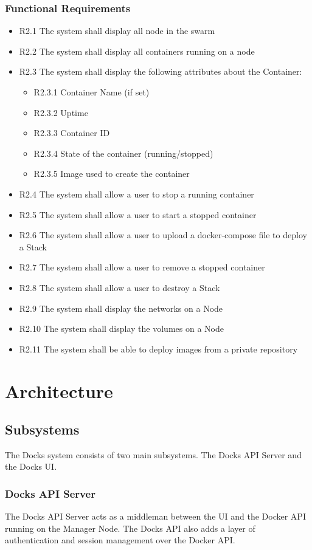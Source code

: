 \documentclass[]{article}
\begin{document}
\subsubsection{Functional Requirements}
\begin{itemize}
	\item R2.1 The system shall display all node in the swarm
	\item R2.2 The system shall display all containers running on a node
	\item R2.3 The system shall display the following attributes about the Container:
		\begin{itemize}
			\item R2.3.1 Container Name (if set)
			\item R2.3.2 Uptime
			\item R2.3.3 Container ID
			\item R2.3.4 State of the container (running/stopped)
			\item R2.3.5 Image used to create the container
		\end{itemize}
	\item R2.4 The system shall allow a user to stop a running container
	\item R2.5 The system shall allow a user to start a stopped container
	\item R2.6 The system shall allow a user to upload a docker-compose file to deploy a Stack
	\item R2.7 The system shall allow a user to remove a stopped container
	\item R2.8 The system shall allow a user to destroy a Stack
	\item R2.9 The system shall display the networks on a Node
	\item R2.10 The system shall display the volumes on a Node
	\item R2.11 The system shall be able to deploy images from a private repository
\end{itemize}

\section{Architecture}
\subsection{Subsystems}
The Docks system consists of two main subsystems. The Docks API Server and the Docks UI.
\subsubsection{Docks API Server}
The Docks API Server acts as a middleman between the UI and the Docker API running on the Manager Node. The Docks API also adds a layer of authentication and session management over the Docker API.
\end{document}
